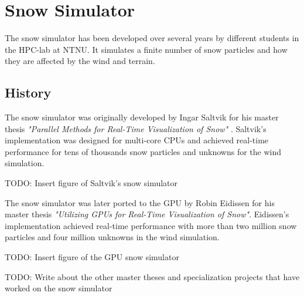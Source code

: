 \section{Snow Simulator}

The snow simulator has been developed over several years by different students in 
the HPC-lab at NTNU. It simulates a finite number of snow particles and how they 
are affected by the wind and terrain. 

\subsection{History}

The snow simulator was originally developed  by Ingar Saltvik for his master
thesis \emph{"Parallel Methods for Real-Time  Visualization of Snow"}
\cite{originalSnowThesis}. Saltvik's implementation was  designed for multi-core
CPUs and achieved real-time performance for tens of  thousands snow particles
and unknowns for the wind simulation.

TODO: Insert figure of Saltvik's snow simulator

The snow simulator was later ported to the GPU by Robin Eidissen for his master 
thesis \emph{"Utilizing GPUs for Real-Time Visualization of Snow"}\cite{gpuSnowThesis}.
Eidissen's implementation achieved real-time performance with more than two million 
snow particles and four million unknowns in the wind simulation. 

TODO: Insert figure of the GPU snow simulator

TODO: Write about the other master theses and specialization projects that 
have worked on the snow simulator

%

